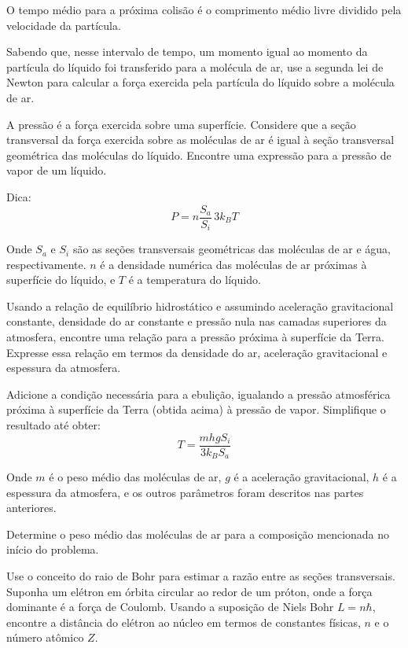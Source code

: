 \documentclass[11pt]{article}
\begin{document}
\begin{pproblem}
\begin{alternativas}
O tempo médio para a próxima colisão é o comprimento médio livre dividido pela velocidade da partícula.

Sabendo que, nesse intervalo de tempo, um momento igual ao momento da partícula do líquido foi transferido para a molécula de ar, use a segunda lei de Newton para calcular a força exercida pela partícula do líquido sobre a molécula de ar. 

\item A pressão é a força exercida sobre uma superfície. Considere que a seção transversal da força exercida sobre as moléculas de ar é igual à seção transversal geométrica das moléculas do líquido. Encontre uma expressão para a pressão de vapor de um líquido. 

Dica:
\begin{equation}
    P = n \frac{S_a}{S_i} \, 3k_BT
\end{equation}

Onde $S_a$ e $S_i$ são as seções transversais geométricas das moléculas de ar e água, respectivamente. $n$ é a densidade numérica das moléculas de ar próximas à superfície do líquido, e $T$ é a temperatura do líquido.

\item Usando a relação de equilíbrio hidrostático e assumindo aceleração gravitacional constante, densidade do ar constante e pressão nula nas camadas superiores da atmosfera, encontre uma relação para a pressão próxima à superfície da Terra. Expresse essa relação em termos da densidade do ar, aceleração gravitacional e espessura da atmosfera. 

\item Adicione a condição necessária para a ebulição, igualando a pressão atmosférica próxima à superfície da Terra (obtida acima) à pressão de vapor. Simplifique o resultado até obter:
\begin{equation}
    T = \frac{mhg S_i}{3k_B S_a}
\end{equation}

Onde $m$ é o peso médio das moléculas de ar, $g$ é a aceleração gravitacional, $h$ é a espessura da atmosfera, e os outros parâmetros foram descritos nas partes anteriores. 

\item Determine o peso médio das moléculas de ar para a composição mencionada no início do problema. 

\item Use o conceito do raio de Bohr para estimar a razão entre as seções transversais. Suponha um elétron em órbita circular ao redor de um próton, onde a força dominante é a força de Coulomb. Usando a suposição de Niels Bohr $L = n\hbar$, encontre a distância do elétron ao núcleo em termos de constantes físicas, $n$ e o número atômico $Z$. 


\end{alternativas}
\end{pproblem}
\end{document}
